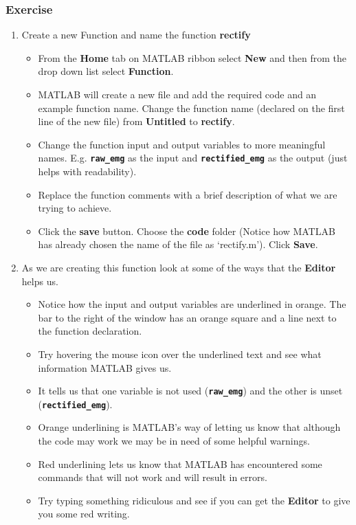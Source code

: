\documentclass[12pt,a4paper]{article}
\begin{document}
\subsubsection*{Exercise}
\begin{enumerate}
	\item Create a new Function and name the function \textbf{rectify}
	\begin{itemize}
		\item From the \textbf{Home} tab on MATLAB ribbon select \textbf{New} and then from the drop down list select \textbf{Function}.
		\item MATLAB will create a new file and add the required code and an example function name.  
		Change the function name (declared on the first line of the new file) from \textbf{Untitled} to \textbf{rectify}.
		\item Change the function input and output variables to more meaningful names.  E.g. \textbf{\texttt{raw\_emg}} as the input and \textbf{\texttt{rectified\_emg}} as the output (just helps with readability).
		\item Replace the function comments with a brief description of what we are trying to achieve.
		\item Click the \textbf{save} button.  Choose the \textbf{code} folder (Notice how MATLAB has already chosen the name of the file as `rectify.m').  Click \textbf{Save}.
	\end{itemize}
	\item As we are creating this function look at some of the ways that the \textbf{Editor} helps us.
	\begin{itemize}
		\item Notice how the input and output variables are underlined in orange.  The bar to the right of the window has an orange square and a line next to the function declaration.
		\item Try hovering the mouse icon over the underlined text and see what information MATLAB gives us.
		\item It tells us that one variable is not used (\textbf{\texttt{raw\_emg}}) and the other is unset (\textbf{\texttt{rectified\_emg}}).
		\item Orange underlining is MATLAB's way of letting us know that although the code may work we may be in need of some helpful warnings.
		\item Red underlining lets us know that MATLAB has encountered some commands that will not work and will result in errors.
		\item Try typing something ridiculous and see if you can get the \textbf{Editor} to give you some red writing.

\end{itemize}
\end{enumerate}
\end{document}
